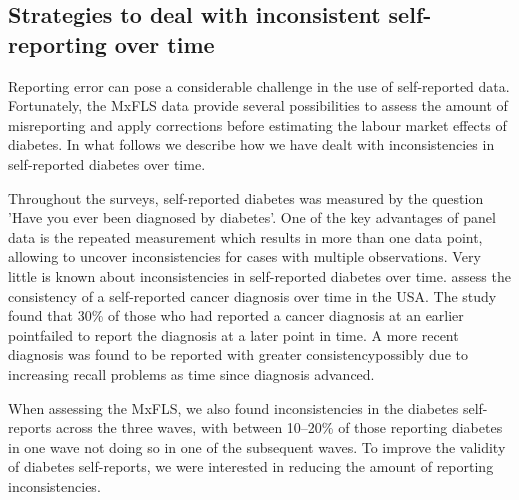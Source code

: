 \documentclass[12pt,english]{article}
\providecommand{\DIFaddtex}[1]{{\protect\color{blue}\uwave{#1}}} %
\providecommand{\DIFaddbegin}{} %
\providecommand{\DIFaddend}{} %
\providecommand{\DIFadd}[1]{\texorpdfstring{\DIFaddtex{#1}}{#1}} %
\begin{document}
\subsection*{\label{sec:Appendix}Strategies to deal with inconsistent self-reporting over time}

Reporting error can pose a considerable challenge in the use of self-reported data. Fortunately, the \ac{MxFLS} data provide several possibilities to assess the amount of misreporting and apply corrections before estimating the labour market effects of diabetes. In what follows we describe how we have dealt with inconsistencies in self-reported diabetes over time.

Throughout the surveys, self-reported diabetes was measured by the question 'Have you ever been diagnosed by diabetes'. One of the key advantages of panel data is the repeated measurement which results in more than one data point, allowing to uncover inconsistencies for cases with multiple observations. Very little is known about inconsistencies in self-reported diabetes over time. \textcite{Zajacova2010} assess the consistency of a self-reported cancer diagnosis over time in the USA. The study found that 30\% of those who had reported a cancer diagnosis at an earlier point\DIFaddbegin \DIFadd{, }\DIFaddend failed to report the diagnosis at a later point in time. A more recent diagnosis was found to be reported with greater consistency\DIFaddbegin \DIFadd{, }\DIFaddend possibly due to increasing recall problems as time since diagnosis advanced.

When assessing the \ac{MxFLS}, we also found inconsistencies in the diabetes self-reports across the three waves, with between 10--20\% of those reporting diabetes in one wave not doing so in one of the subsequent waves. To improve the validity of diabetes self-reports, we were interested in reducing the amount of reporting inconsistencies.
\end{document}
